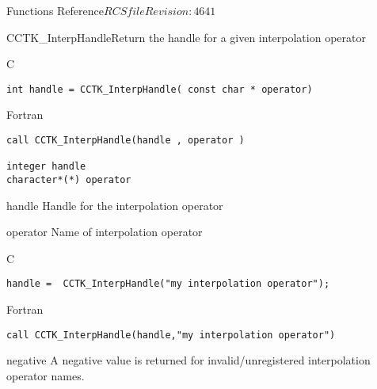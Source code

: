 \begin{cactuspart}{ Functions Reference}{$RCSfile$}{$Revision: 4641 $}

\begin{FunctionDescription}{CCTK\_InterpHandle}{Return the handle for a given interpolation operator}
\label{CCTK-InterpHandle}
\begin{SynopsisSection}
\begin{Synopsis}{C}
\begin{verbatim}int handle = CCTK_InterpHandle( const char * operator)\end{verbatim}
\end{Synopsis}
\begin{Synopsis}{Fortran}
\begin{verbatim}call CCTK_InterpHandle(handle , operator )

integer handle
character*(*) operator\end{verbatim}
\end{Synopsis}
\end{SynopsisSection}
\begin{ParameterSection}
\begin{Parameter}{handle}
Handle for the interpolation operator
\end{Parameter}
\begin{Parameter}{operator}
Name of interpolation operator
\end{Parameter}
\end{ParameterSection}

\begin{ExampleSection}
\begin{Example}{C}
\begin{verbatim}
handle =  CCTK_InterpHandle("my interpolation operator");
\end{verbatim}
\end{Example}
\begin{Example}{Fortran}
\begin{verbatim}
call CCTK_InterpHandle(handle,"my interpolation operator")
\end{verbatim}
\end{Example}
\end{ExampleSection}
\begin{ErrorSection}
\begin{Error}{negative}
A negative value is returned for invalid/unregistered interpolation operator names.
\end{Error}
\end{ErrorSection}
\end{FunctionDescription}


\end{cactuspart}

